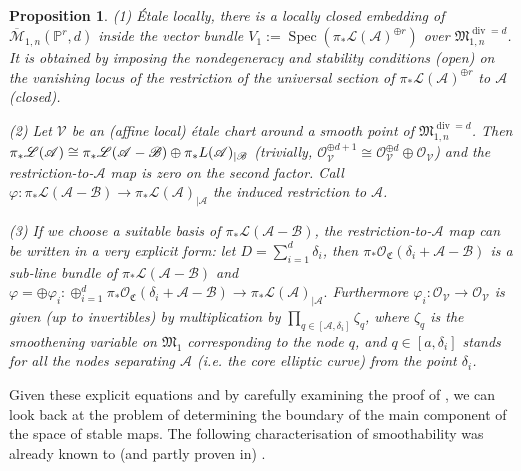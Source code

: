 \documentclass[11pt]{amsart}
\newcommand{\M}[4]{\overline{\mathcal M}_{#1,#2}(#3,#4)}
\newcommand{\PP}{\mathbb P}
\renewcommand{\to}{\rightarrow}
\newcommand{\A}{\mathcal A}
\newcommand{\B}{\mathcal B}
\newcommand{\Spec}{\operatorname{Spec}}
\theoremstyle{plain}
\newtheorem{prop}[thm]{Proposition}
\theoremstyle{definition}
\begin{document}
\begin{prop}
\emph{(1)} \'{E}tale locally, there is a locally closed embedding of $\M{1}{n}{\PP^r}{d}$ inside the vector bundle $V_1:=\Spec(\pi_*\mathcal L(\A)^{\oplus r})$ over $\mathfrak M_{1,n}^{\operatorname{div}=d}$. It is obtained by imposing the nondegeneracy and stability conditions \emph{(open)} on the vanishing locus of the restriction of the universal section of $\pi_*\mathcal L(\A)^{\oplus r}$ to $\A$ \emph{(closed)}.

\emph{(2)} Let $\mathcal V$ be an (affine local) \'{e}tale chart around a smooth point of $\mathfrak M_{1,n}^{\operatorname{div}=d}$. Then $\pi_*\mathcal L(\A)\cong \pi_*\mathcal L(\A-\B)\oplus \pi_*\mathcal \mathcal L(\A)_{|\B}$ (trivially, $\mathcal O_{\mathcal V}^{\oplus d+1}\cong\mathcal O_{\mathcal V}^{\oplus d}\oplus\mathcal O_{\mathcal V}$) and the restriction-to-$\A$ map is zero on the second factor. Call $\varphi\colon \pi_*\mathcal L(\A-\B)\to\pi_*\mathcal L(\A)_{|\A}$ the induced  restriction to $\A$.

\emph{(3)} If we choose a suitable basis of $\pi_*\mathcal L(\A-\B)$, the restriction-to-$\A$ map can be written in a very explicit form: let $D=\sum_{i=1}^d\delta_i$, then $\pi_*\mathcal O_{\mathfrak C}(\delta_i+\A-\B)$ is a sub-line bundle of $\pi_*\mathcal L(\A-\B)$ and $\varphi=\oplus\varphi_i\colon\oplus_{i=1}^d \pi_*\mathcal O_{\mathfrak C}(\delta_i+\A-\B)\to \pi_*\mathcal L(\A)_{|\A}.$ Furthermore $\varphi_i\colon\mathcal O_\mathcal V\to\mathcal O_\mathcal V$ is given (up to invertibles) by multiplication by $\prod_{q\in[\A,\delta_i]}\zeta_q$, where $\zeta_q$ is the smoothening variable on $\mathfrak M_1$ corresponding to the node $q$, and $q\in[a,\delta_i]$ stands for all the nodes separating $\A$ (i.e. the core elliptic curve) from the point $\delta_i$.
\end{prop}

Given these explicit equations and by carefully examining the proof of \cite[Prop. 4.13]{HL}, we can look back at the problem of determining the boundary of the main component of the space of stable maps. The following characterisation of smoothability was already known to (and partly proven in) \cite[Lem. 5.9]{Vre}.
\end{document}
